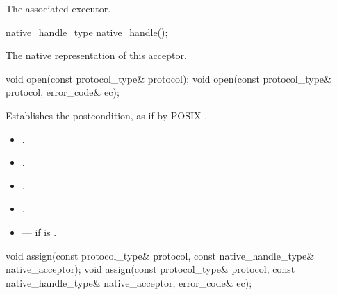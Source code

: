 \begin{itemdescr}
\pnum
\returns The associated executor.
\end{itemdescr}

\begin{itemdecl}
native_handle_type native_handle();
\end{itemdecl}

\begin{itemdescr}
\pnum
\returns The native representation of this acceptor.
\end{itemdescr}

\begin{itemdecl}
void open(const protocol_type& protocol);
void open(const protocol_type& protocol, error_code& ec);
\end{itemdecl}

\begin{itemdescr}
\pnum
\effects Establishes the postcondition, as if by POSIX .

\pnum
\postconditions 
\begin{itemize}
\item
{}.
\item
{}.
\item
{}.
\item
{}.
\end{itemize}

\pnum
\errors
\begin{itemize}
\item
{} --- if  is .
\end{itemize}
\end{itemdescr}

\begin{itemdecl}
void assign(const protocol_type& protocol,
            const native_handle_type& native_acceptor);
void assign(const protocol_type& protocol,
            const native_handle_type& native_acceptor, error_code& ec);
\end{itemdecl}

